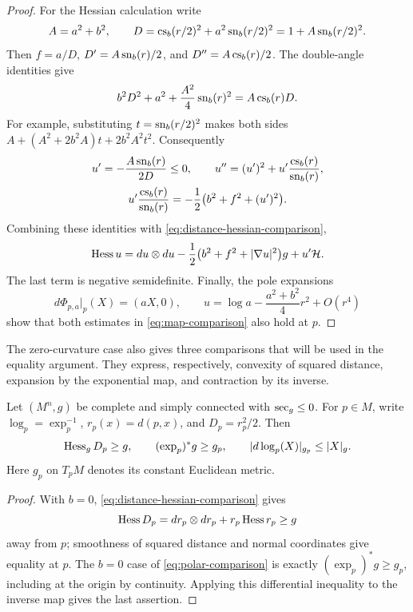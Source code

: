 \begin{proof}
For the Hessian calculation write
\[
 A=a^2+b^2,\qquad
 D=\operatorname{cs}_b(r/2)^2+a^2\operatorname{sn}_b(r/2)^2=1+A\operatorname{sn}_b(r/2)^2.
\]
Then $f=a/D$, $D'=A\operatorname{sn}_b(r)/2$, and $D''=A\operatorname{cs}_b(r)/2$.
The double-angle identities give
\[
 b^2D^2+a^2+\frac{A^2}{4}\operatorname{sn}_b(r)^2=A\operatorname{cs}_b(r)D.
\]
For example, substituting $t=\operatorname{sn}_b(r/2)^2$ makes both sides
$A+(A^2+2b^2A)t+2b^2A^2t^2$. Consequently
\begin{equation}\label{eq:radial-identities}
 \begin{gathered}
 u'=-\frac{A\operatorname{sn}_b(r)}{2D}\le0,\qquad
 u''=(u')^2+u'\frac{\operatorname{cs}_b(r)}{\operatorname{sn}_b(r)},\\
 u'\frac{\operatorname{cs}_b(r)}{\operatorname{sn}_b(r)}
 =-\frac12\bigl(b^2+f^2+(u')^2\bigr).
 \end{gathered}
\end{equation}
Combining these identities with \eqref{eq:distance-hessian-comparison},
\[
 \operatorname{Hess} u
 =du\otimes du-\frac12\bigl(b^2+f^2+|\nabla u|^2\bigr)g
       +u'\mathcal H.
\]
The last term is negative semidefinite. Finally, the pole expansions
\[
 d\Phi_{p,a}|_p(X)=(aX,0),\qquad
 u=\log a-\frac{a^2+b^2}{4}r^2+O(r^4)
\]
show that both estimates in \eqref{eq:map-comparison} also hold at $p$.
\end{proof}

The zero-curvature case also gives three comparisons that will be used
in the equality argument. They express, respectively, convexity of
squared distance, expansion by the exponential map, and contraction
by its inverse.

\begin{corollary}\label{lem:distance-comparison}
Let $(M^n,g)$ be complete and simply connected with $\operatorname{sec}_g\le0$.
For $p\in M$, write $\log_p=\exp_p^{-1}$, $r_p(x)=d(p,x)$, and
$D_p=r_p^2/2$. Then
\begin{equation}\label{eq:distance-metric-comparison}
 \operatorname{Hess}_gD_p\ge g,\qquad (\exp_p)^*g\ge g_p,
 \qquad |d\log_p(X)|_{g_p}\le |X|_g.
\end{equation}
Here $g_p$ on $T_pM$ denotes its constant Euclidean metric.
\end{corollary}

\begin{proof}
With $b=0$, \eqref{eq:distance-hessian-comparison} gives
\[
 \operatorname{Hess} D_p=dr_p\otimes dr_p+r_p\operatorname{Hess} r_p\ge g
\]
away from $p$; smoothness of squared distance and normal coordinates
give equality at $p$. The $b=0$ case of
\eqref{eq:polar-comparison} is exactly $(\exp_p)^*g\ge g_p$,
including at the origin by continuity. Applying this differential
inequality to the inverse map gives the last assertion.
\end{proof}

